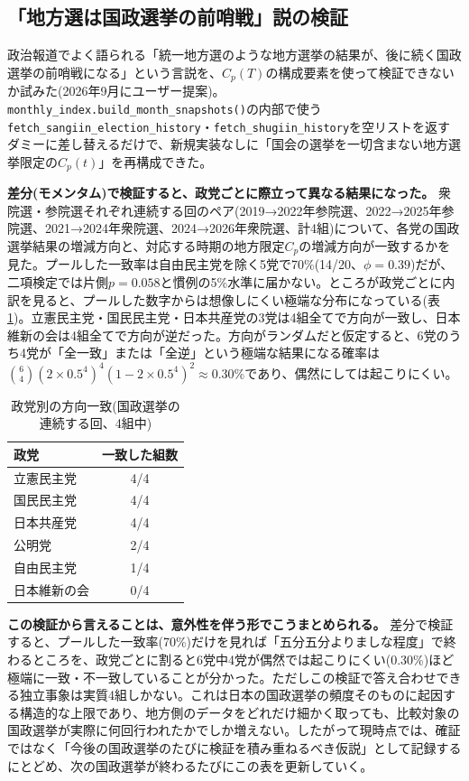 \documentclass[a4paper,11pt]{ltjsarticle}
\begin{document}
\subsection{「地方選は国政選挙の前哨戦」説の検証}
\label{sec:local-national-precursor}

政治報道でよく語られる「統一地方選のような地方選挙の結果が、後に続く国政選挙の前哨戦になる」という言説を、$C_p(T)$の構成要素を使って検証できないか試みた(2026年9月にユーザー提案)。\texttt{monthly\_index.build\_month\_snapshots()}の内部で使う\texttt{fetch\_sangiin\_election\_history}・\texttt{fetch\_shugiin\_history}を空リストを返すダミーに差し替えるだけで、新規実装なしに「国会の選挙を一切含まない地方選挙限定の$C_p(t)$」を再構成できた。

\textbf{差分(モメンタム)で検証すると、政党ごとに際立って異なる結果になった。} 衆院選・参院選それぞれ連続する回のペア(2019→2022年参院選、2022→2025年参院選、2021→2024年衆院選、2024→2026年衆院選、計4組)について、各党の国政選挙結果の増減方向と、対応する時期の地方限定$C_p$の増減方向が一致するかを見た。プールした一致率は自由民主党を除く5党で70\%(14/20、$\phi=0.39$)だが、二項検定では片側$p=0.058$と慣例の5\%水準に届かない。ところが政党ごとに内訳を見ると、プールした数字からは想像しにくい極端な分布になっている(表\ref{tab:local-momentum})。立憲民主党・国民民主党・日本共産党の3党は4組全てで方向が一致し、日本維新の会は4組全てで方向が逆だった。方向がランダムだと仮定すると、6党のうち4党が「全一致」または「全逆」という極端な結果になる確率は$\binom{6}{4}(2\times0.5^4)^4(1-2\times0.5^4)^2\approx0.30\%$であり、偶然にしては起こりにくい。

\begin{table}[h]
\centering
\small
\caption{政党別の方向一致(国政選挙の連続する回、4組中)}
\label{tab:local-momentum}
\begin{tabular}{lc}
\toprule
政党 & 一致した組数 \\
\midrule
立憲民主党 & 4/4 \\
国民民主党 & 4/4 \\
日本共産党 & 4/4 \\
公明党 & 2/4 \\
自由民主党 & 1/4 \\
日本維新の会 & 0/4 \\
\bottomrule
\end{tabular}
\end{table}

\textbf{この検証から言えることは、意外性を伴う形でこうまとめられる。} 差分で検証すると、プールした一致率(70\%)だけを見れば「五分五分よりましな程度」で終わるところを、政党ごとに割ると6党中4党が偶然では起こりにくい(0.30\%)ほど極端に一致・不一致していることが分かった。ただしこの検証で答え合わせできる独立事象は実質4組しかない。これは日本の国政選挙の頻度そのものに起因する構造的な上限であり、地方側のデータをどれだけ細かく取っても、比較対象の国政選挙が実際に何回行われたかでしか増えない。したがって現時点では、確証ではなく「今後の国政選挙のたびに検証を積み重ねるべき仮説」として記録するにとどめ、次の国政選挙が終わるたびにこの表を更新していく。
\end{document}
